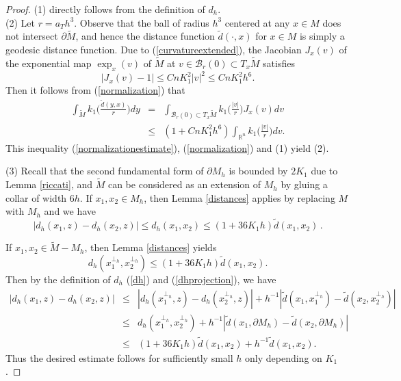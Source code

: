 \documentclass[11pt,letterpaper]{amsart}
\numberwithin{equation}{section}
\theoremstyle{definition}
\theoremstyle{plain}
\theoremstyle{definition}
\theoremstyle{plain}
\theoremstyle{definition}
\theoremstyle{plain}
\begin{document}
\begin{proof}
(1) directly follows from the definition of $d_h$.\\
(2) Let $r=a_T h^3$. Observe that the ball of radius $h^3$ centered at any $x\in M$ does not intersect $\partial \widetilde{M}$, and hence the distance function $\widetilde{d}(\cdot,x)$ for $x\in M$ is simply a geodesic distance function. Due to (\ref{curvatureextended}), the Jacobian $J_x(v)$ of the exponential map $\exp_x(v)$ of $\widetilde{M}$ at $v\in \mathcal{B}_{r}(0)\subset T_x\widetilde{M}$ satisfies
\begin{equation}\label{Jacobian}
|J_x(v)-1| \leqslant CnK_1^2|v|^2 \leqslant CnK_1^2 h^6.
\end{equation}
Then it follows from (\ref{normalization}) that
\begin{eqnarray}\label{normalizationestimate}
\int_{\widetilde{M}} k_1\big(\frac{\widetilde{d}(y,x)}{r}\big)dy&=& 
\int_{\mathcal{B}_{r}(0)\subset T_x{\widetilde{M}}} k_1\big(\frac{|v|}{r}\big)J_x(v)dv \nonumber \\
&\leqslant& (1+CnK_1^2h^6) \int_{\mathbb{R}^n} k_1\big(\frac{|v|}{r}\big)dv.
\end{eqnarray}
This inequality (\ref{normalizationestimate}), (\ref{normalization}) and (1) yield (2). 

\smallskip
\noindent (3) Recall that the second fundamental form of $\partial M_h$ is bounded by $2K_1$ due to Lemma \ref{riccati}, and $\widetilde{M}$ can be considered as an extension of $M_h$ by gluing a collar of width $6h$. If $x_1,x_2\in M_h$, then Lemma \ref{distances} applies by replacing $M$ with $M_h$ and we have
\begin{equation}\label{dhprojection}
|d_h(x_1,z)-d_h(x_2,z)|\leqslant d_h(x_1,x_2)\leqslant (1+36K_1h)\widetilde{d}(x_1,x_2)\, .
\end{equation}

If $x_1,x_2\in \widetilde{M}-M_h$, then Lemma \ref{distances} yields
$$d_h(x_1^{\perp_h},x_2^{\perp_h})\leqslant (1+36K_1h)\widetilde{d}(x_1,x_2).$$
Then by the definition of $d_h$ (\ref{dh}) and (\ref{dhprojection}), we have
\begin{eqnarray*}
|d_h(x_1,z)-d_h(x_2,z)|&\leqslant& |d_h(x_1^{\perp_h},z)-d_h(x_2^{\perp_h},z)|+ h^{-1}|\widetilde{d}(x_1,x_1^{\perp_h})-\widetilde{d}(x_2,x_2^{\perp_h})| \\
&\leqslant& d_h(x_1^{\perp_h},x_2^{\perp_h}) + h^{-1}|\widetilde{d}(x_1,\partial M_h)-\widetilde{d}(x_2,\partial M_h)| \\
&\leqslant& (1+36K_1h)\widetilde{d}(x_1,x_2)+h^{-1}\widetilde{d}(x_1,x_2).
\end{eqnarray*}
Thus the desired estimate follows for sufficiently small $h$ only depending on $K_1$.


\end{proof}
\end{document}
